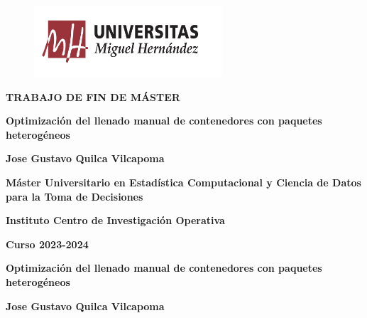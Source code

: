 \documentclass[openany]{article}
\begin{document}

\thispagestyle{empty}

\begin{titlepage}
    \begin{figure}[th]
        \begin{flushleft}
            \includegraphics[width=7cm]{Figures/image1.png}
        \end{flushleft}
    \end{figure}
    \vspace{1cm}

    {\flushleft \LARGE \bfseries TRABAJO DE FIN DE MÁSTER\par}\vspace{2cm}

    {\flushright \LARGE \bfseries Optimización del llenado manual de contenedores con paquetes heterogéneos  \par}\vspace{2cm}

    {\flushleft \LARGE \bfseries Jose Gustavo Quilca Vilcapoma \par}\vspace{1.5cm}

    {\flushleft \bfseries Máster Universitario en Estadística Computacional y Ciencia de Datos para la Toma de Decisiones\par}\vspace{0.cm}
    {\flushleft \bfseries Instituto Centro de Investigación Operativa\par}\vspace{1cm}

    {\flushleft \small \bfseries Curso 2023-2024\par}\vspace{2cm}

    \newpage\thispagestyle{empty}

    {\flushleft \LARGE \bfseries Optimización del llenado manual de contenedores con paquetes heterogéneos \par} \vspace{1.5cm}

    {\flushleft \LARGE \bfseries Jose Gustavo Quilca Vilcapoma \par}\vspace{1.5cm}


\end{titlepage}
\end{document}
